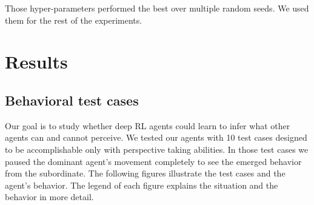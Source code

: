 \documentclass{article}
\begin{document}
Those hyper-parameters performed the best over multiple random seeds. We used them for the rest of the experiments.

\section{Results}

\subsection{Behavioral test cases}
Our goal is to study whether deep RL agents could learn to infer what other agents can and cannot perceive. We tested our agents with 10 test cases designed to be accomplishable only with perspective taking abilities. In those test cases we paused the dominant agent's movement completely to see the emerged behavior from the subordinate. The following figures illustrate the test cases and the agent's behavior. The legend of each figure explains the situation and the behavior in more detail.
\end{document}
